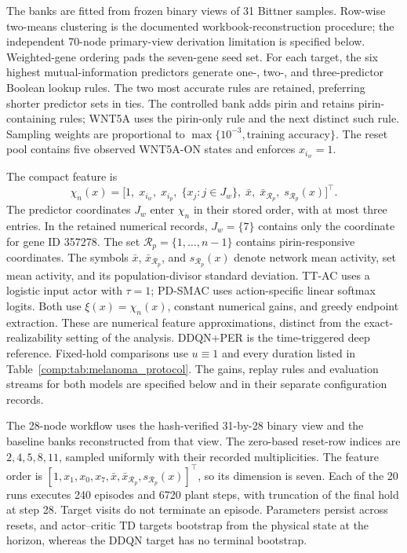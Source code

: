 \documentclass[11pt]{article}
\newcommand{\1}{\mathbf{1}}
\begin{document}
The banks are fitted from frozen binary views of 31 Bittner samples. Row-wise two-means clustering is the documented workbook-reconstruction procedure; the independent 70-node primary-view derivation limitation is specified below. Weighted-gene ordering pads the seven-gene seed set. For each target, the six highest mutual-information predictors generate one-, two-, and three-predictor Boolean lookup rules. The two most accurate rules are retained, preferring shorter predictor sets in ties. The controlled bank adds pirin and retains pirin-containing rules; WNT5A uses the pirin-only rule and the next distinct such rule. Sampling weights are proportional to $\max\{10^{-3},\text{training accuracy}\}$. The reset pool contains five observed WNT5A-ON states and enforces $x_{i_w}=1$.

The compact feature is
\[
\chi_n(x)=\bigl[1,\;x_{i_w},\;x_{i_p},\;\{x_j:j\in J_w\},\;
\bar x,\;\bar x_{\mathcal R_p},\;s_{\mathcal R_p}(x)\bigr]^\top.
\]
The predictor coordinates $J_w$ enter $\chi_n$ in their stored order, with at most three entries. In the retained numerical records, $J_w=\{7\}$ contains only the coordinate for gene ID 357278. The set $\mathcal R_p=\{1,\ldots,n-1\}$ contains pirin-responsive coordinates. The symbols $\bar x$, $\bar x_{\mathcal R_p}$, and $s_{\mathcal R_p}(x)$ denote network mean activity, set mean activity, and its population-divisor standard deviation. TT-AC uses a logistic input actor with $\tau=1$; PD-SMAC uses action-specific linear softmax logits. Both use $\xi(x)=\chi_n(x)$, constant numerical gains, and greedy endpoint extraction. These are numerical feature approximations, distinct from the exact-realizability setting of the analysis. DDQN+PER is the time-triggered deep reference. Fixed-hold comparisons use $u\equiv1$ and every duration listed in Table~\ref{comp:tab:melanoma_protocol}. The gains, replay rules and evaluation streams for both models are specified below and in their separate configuration records.

The 28-node workflow uses the hash-verified 31-by-28 binary view and the baseline banks reconstructed from that view. The zero-based reset-row indices are $2,4,5,8,11$, sampled uniformly with their recorded multiplicities. The feature order is $[1,x_1,x_0,x_7,\bar x,\bar x_{\mathcal R_p},s_{\mathcal R_p}(x)]^\top$, so its dimension is seven. Each of the 20 runs executes 240 episodes and 6720 plant steps, with truncation of the final hold at step 28. Target visits do not terminate an episode. Parameters persist across resets, and actor--critic TD targets bootstrap from the physical state at the horizon, whereas the DDQN target has no terminal bootstrap.
\end{document}

